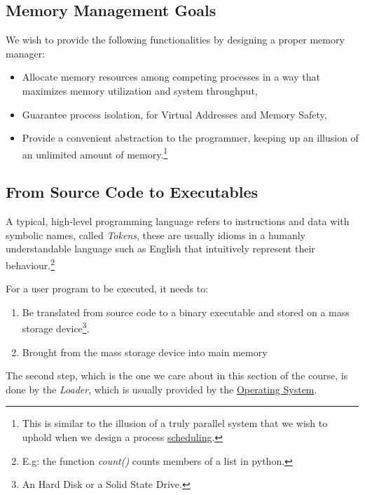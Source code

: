 \documentclass[openright, twoside]{report}
\theoremstyle{definition}
\theoremstyle{example}
\begin{document}
		\subsection{Memory Management Goals}
			We wish to provide the following functionalities by designing a proper memory manager:
			\begin{itemize}
				\item Allocate memory resources among competing processes in a way that maximizes memory utilization and system throughput,
				\item Guarantee process isolation, for Virtual Addresses and Memory Safety,
				\item Provide a convenient abstraction to the programmer, keeping up an illusion of an unlimited amount of memory.\footnote{This is similar to the illusion of a truly parallel system that we wish to uphold when we design a process \hyperref[sec:scheduling]{scheduling}.}
			\end{itemize}
		
		\subsection{From Source Code to Executables}

		A typical, high-level programming language refers to instructions and data with symbolic names, called \emph{Tokens},
		these are usually idioms in a humanly understandable language such as English that intuitively represent their behaviour.\footnote{E.g: the function
		\emph{count()} counts members of a list in python.}


		For a user program to be executed, it needs to:
		\begin{enumerate}
			\item Be translated from source code to a binary executable and stored on a mass storage device\footnote{An Hard Disk or a Solid State Drive.}.
			\item Brought from the mass storage device into main memory
		\end{enumerate}

		The second step, which is the one we care about in this section of the course, is done by the \emph{Loader}, which is usually provided by the 
		\hyperref[sec:OS]{Operating System}.
\end{document}
